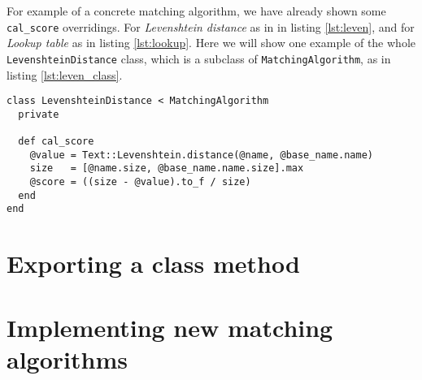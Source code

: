 For example of a concrete matching algorithm,
we have already shown some \texttt{cal\_score} overridings. For
\emph{Levenshtein distance} as in in listing \ref{lst:leven},
and for \emph{Lookup table} as in listing \ref{lst:lookup}.
Here we will show one example of the whole \texttt{LevenshteinDistance} class,
which is a subclass of \texttt{MatchingAlgorithm}, as in listing \ref{lst:leven_class}.

\begin{minipage}{\linewidth}
\begin{lstlisting}[label={lst:leven_class}, caption={\texttt{LevenshteinDistance} class.}]
class LevenshteinDistance < MatchingAlgorithm
  private

  def cal_score
    @value = Text::Levenshtein.distance(@name, @base_name.name)
    size   = [@name.size, @base_name.name.size].max
    @score = ((size - @value).to_f / size)
  end
end
\end{lstlisting}
\end{minipage}

\section{Exporting a class method}

\section{Implementing new matching algorithms}
